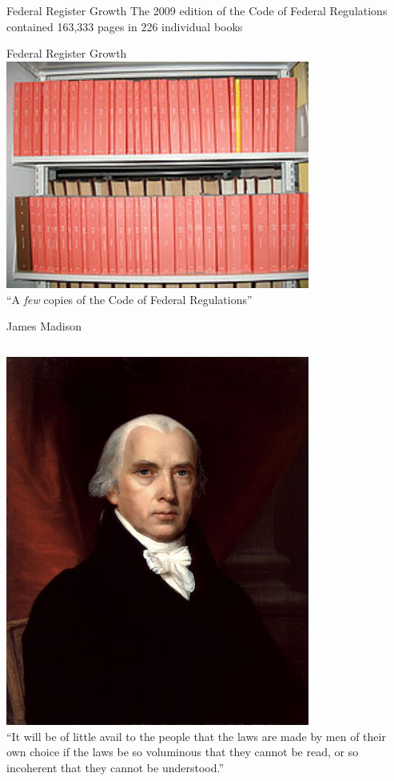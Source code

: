 \begin{frame}{Federal Register Growth}
    The 2009 edition of the Code of Federal Regulations contained 163,333 pages in 226 individual books
\end{frame}

\begin{frame}{Federal Register Growth}
    \centering
    \includegraphics[width=0.75\textwidth]{img/fed-reg-bookshelf.png} \\
    { \large ``A \emph{few} copies of the Code of Federal Regulations'' \\ }
\end{frame}

\begin{frame}{James Madison}
    \begin{columns}[onlytextwidth]
            \centering
            \includegraphics[width=0.75\textwidth]{img/madison.jpg} \\
            ``It will be of little avail to the people that the laws are made
            by men of their own choice if the laws be so voluminous that they
            cannot be read, or so incoherent that they cannot be understood.''
    \end{columns}
\end{frame}

